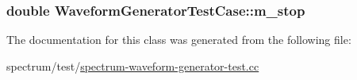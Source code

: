 \subsubsection[{\texorpdfstring{m\+\_\+stop}{m_stop}}]{\setlength{\rightskip}{0pt plus 5cm}double Waveform\+Generator\+Test\+Case\+::m\+\_\+stop\hspace{0.3cm}{\ttfamily [private]}}\hypertarget{classWaveformGeneratorTestCase_aae568120afb7efd05030660064038668}{}\label{classWaveformGeneratorTestCase_aae568120afb7efd05030660064038668}


The documentation for this class was generated from the following file\+:\begin{DoxyCompactItemize}
\item 
spectrum/test/\hyperlink{spectrum-waveform-generator-test_8cc}{spectrum-\/waveform-\/generator-\/test.\+cc}\end{DoxyCompactItemize}
